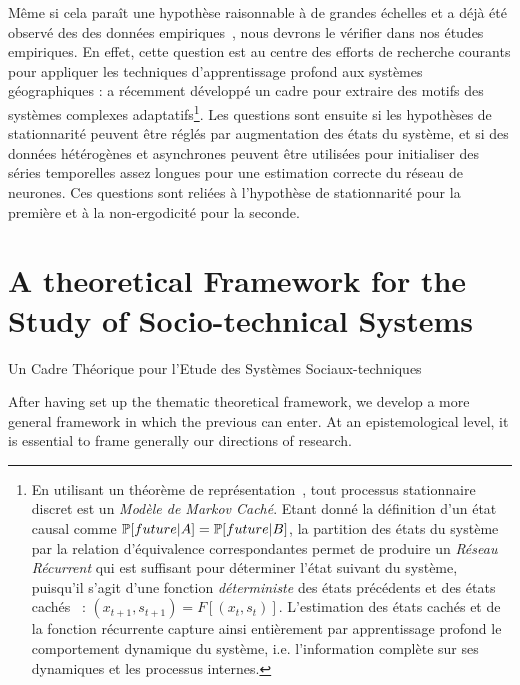 {Même si cela paraît une hypothèse raisonnable à de grandes échelles et a déjà été observé des des données empiriques~\cite{sanders1992systeme}, nous devrons le vérifier dans nos études empiriques. En effet, cette question est au centre des efforts de recherche courants pour appliquer les techniques d'apprentissage profond aux systèmes géographiques :  a récemment développé un cadre pour extraire des motifs des systèmes complexes adaptatifs\footnote{En utilisant un théorème de représentation~\cite{knight1975predictive}, tout processus stationnaire discret est un \emph{Modèle de Markov Caché}. Etant donné la définition d'un état causal comme $\operatorname{\mathbb{P}}\!\left[future | A\right] = \operatorname{\mathbb{P}}\!\left[future | B\right]$, la partition des états du système par la relation d'équivalence correspondantes permet de produire un \emph{Réseau Récurrent} qui est suffisant pour déterminer l'état suivant du système, puisqu'il s'agit d'une fonction \emph{déterministe} des états précédents et des états cachés~\cite{shalizi2001computational} : $(x_{t+1},s_{t+1}) = F\left[(x_t,s_t)\right]$. L'estimation des états cachés et de la fonction récurrente capture ainsi entièrement par apprentissage profond le comportement dynamique du système, i.e. l'information complète sur ses dynamiques et les processus internes.}. Les questions sont ensuite si les hypothèses de stationnarité peuvent être réglés par augmentation des états du système, et si des données hétérogènes et asynchrones peuvent être utilisées pour initialiser des séries temporelles assez longues pour une estimation correcte du réseau de neurones. 
Ces questions sont reliées à l'hypothèse de stationnarité pour la première et à la non-ergodicité pour la seconde.
}





\newpage

\section{A theoretical Framework for the Study of Socio-technical Systems}{Un Cadre Théorique pour l'Etude des Systèmes Sociaux-techniques}

After having set up the thematic theoretical framework, we develop a more general framework in which the previous can enter. At an epistemological level, it is essential to frame generally our directions of research.


